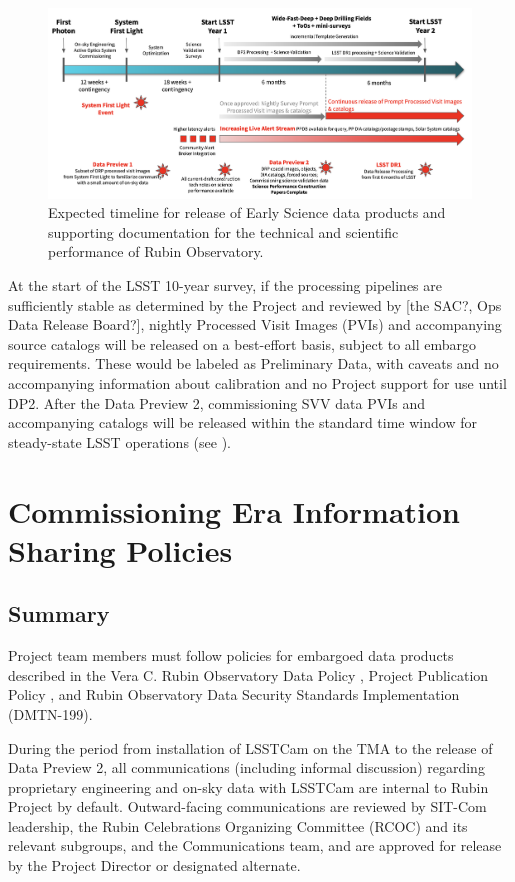 \documentclass[SE,authoryear,toc,lsstdraft]{lsstdoc}
\begin{document}
\begin{figure}
  \includegraphics[width=1.0\textwidth]{timeline.png}
  \caption{Expected timeline for release of Early Science data products and supporting documentation for the technical and scientific performance of Rubin Observatory.}
  \label{timeline}
\end{figure}

At the start of the LSST 10-year survey, if the processing pipelines are sufficiently stable as determined by the Project and reviewed by [the SAC?, Ops Data Release Board?], nightly Processed Visit Images (PVIs) and accompanying source catalogs will be released on a best-effort basis, subject to all embargo requirements.
These would be labeled as Preliminary Data, with caveats and no accompanying information about calibration and no Project support for use until DP2.  After the Data Preview 2, commissioning SVV data PVIs and accompanying catalogs will be released within the standard time window for steady-state LSST operations (see ).

\section{Commissioning Era Information Sharing Policies}
\label{policy}

\subsection{Summary}

Project team members must follow policies for embargoed data products described in the Vera C. Rubin Observatory Data Policy , Project Publication Policy , and Rubin Observatory Data Security Standards Implementation (DMTN-199).

During the period from installation of LSSTCam on the TMA to the release of Data Preview 2, all communications (including informal discussion) regarding proprietary engineering and on-sky data with LSSTCam are internal to Rubin Project by default.
Outward-facing communications are reviewed by SIT-Com leadership, the Rubin Celebrations Organizing Committee (RCOC) and its relevant subgroups, and the Communications team, and are approved for release by the Project Director or designated alternate.
\end{document}
